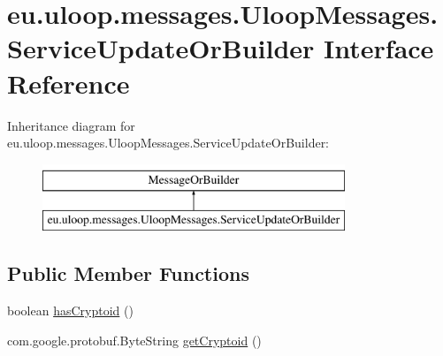 \hypertarget{interfaceeu_1_1uloop_1_1messages_1_1UloopMessages_1_1ServiceUpdateOrBuilder}{\section{eu.\+uloop.\+messages.\+Uloop\+Messages.\+Service\+Update\+Or\+Builder Interface Reference}
\label{interfaceeu_1_1uloop_1_1messages_1_1UloopMessages_1_1ServiceUpdateOrBuilder}
}
Inheritance diagram for eu.\+uloop.\+messages.\+Uloop\+Messages.\+Service\+Update\+Or\+Builder\+:\begin{figure}[H]
\begin{center}
\leavevmode
\includegraphics[height=2.000000cm]{interfaceeu_1_1uloop_1_1messages_1_1UloopMessages_1_1ServiceUpdateOrBuilder}
\end{center}
\end{figure}
\subsection*{Public Member Functions}
\begin{DoxyCompactItemize}
\item 
boolean \hyperlink{interfaceeu_1_1uloop_1_1messages_1_1UloopMessages_1_1ServiceUpdateOrBuilder_a15241d25a1c3db88ecb538ca988270df}{has\+Cryptoid} ()
\item 
com.\+google.\+protobuf.\+Byte\+String \hyperlink{interfaceeu_1_1uloop_1_1messages_1_1UloopMessages_1_1ServiceUpdateOrBuilder_a1377c7c0cf844b024a8a2c882a306ab0}{get\+Cryptoid} ()
\end{DoxyCompactItemize}


